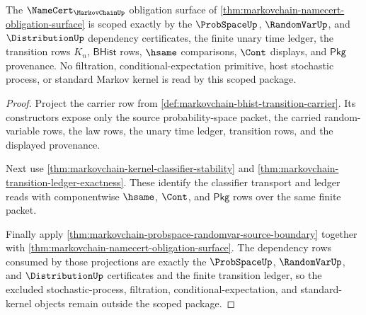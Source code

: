\begin{theorem}
\label{thm:markovchain-scoped-kernel-dependency-package}
The $\NameCert_{\MarkovChainUp}$ obligation surface of \autoref{thm:markovchain-namecert-obligation-surface} is scoped exactly by the $\ProbSpaceUp$, $\RandomVarUp$, and $\DistributionUp$ dependency certificates, the finite unary time ledger, the transition rows $K_n$, $\mathsf{BHist}$ rows, $\hsame$ comparisons, $\Cont$ displays, and $\mathsf{Pkg}$ provenance. No filtration, conditional-expectation primitive, host stochastic process, or standard Markov kernel is read by this scoped package.
\end{theorem}
\begin{proof}
Project the carrier row from \autoref{def:markovchain-bhist-transition-carrier}. Its constructors expose only the source probability-space packet, the carried random-variable rows, the law rows, the unary time ledger, transition rows, and the displayed provenance.

Next use \autoref{thm:markovchain-kernel-classifier-stability} and \autoref{thm:markovchain-transition-ledger-exactness}. These identify the classifier transport and ledger reads with componentwise $\hsame$, $\Cont$, and $\mathsf{Pkg}$ rows over the same finite packet.

Finally apply \autoref{thm:markovchain-probspace-randomvar-source-boundary} together with \autoref{thm:markovchain-namecert-obligation-surface}. The dependency rows consumed by those projections are exactly the $\ProbSpaceUp$, $\RandomVarUp$, and $\DistributionUp$ certificates and the finite transition ledger, so the excluded stochastic-process, filtration, conditional-expectation, and standard-kernel objects remain outside the scoped package.
\end{proof}

